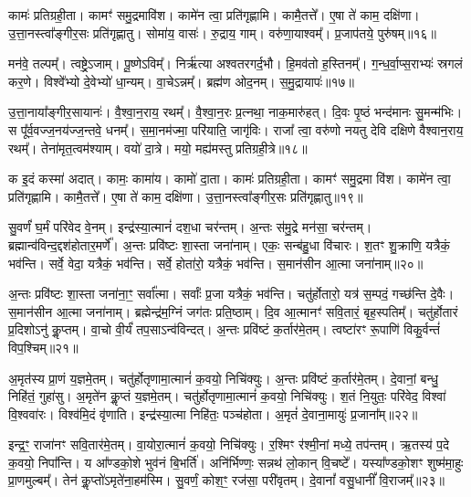 कामः॑ प्रतिग्रही॒ता। 
कामꣳ॑ समु॒द्रमावि॑श। 
कामे॑न त्वा॒ प्रति॑गृह्णामि। 
कामै॒तत्ते᳚। 
ए॒षा ते॑ काम॒ दक्षि॑णा। 
उ॒त्ता॒नस्त्वा᳚ङ्गीर॒सः प्रति॑गृह्णातु। 
सोमा॑य॒ वासः॑। 
रु॒द्राय॒ गाम्। 
वरु॑णा॒याश्वम्᳚। 
प्र॒जाप॑तये॒ पुरु॑षम्॥१६॥%

मन॑वे॒ तल्पम्᳚। 
त्वष्ट्रे॒ऽजाम्। 
पू॒ष्णेऽविम्᳚। 
निर्\mbox{}ऋ॑त्या अश्वतरगर्द॒भौ। 
हि॒मव॑तो ह॒स्तिनम्᳚। 
ग॒न्ध॒र्वा॒प्स॒राभ्यः॑ स्रगलं कर॒णे। 
विश्वे᳚भ्यो दे॒वेभ्यो॑ धा॒न्यम्। 
वा॒चेऽन्नम्᳚। 
ब्रह्म॑ण ओद॒नम्। 
स॒मु॒द्रायापः॑॥१७॥

उ॒त्ता॒नाया᳚ङ्गीर॒सायानः॑। 
वै॒श्वा॒न॒राय॒ रथम्᳚। 
वै॒श्वा॒न॒रः प्र॒त्नथा॒ नाक॒मारु॑हत्। 
दि॒वः पृ॒ष्ठं भन्द॑मानः सु॒मन्म॑भिः। 
स पू᳚र्व॒वज्ज॒नय॑ज्ज॒न्तवे॒ धनम्᳚। 
स॒मा॒नम॑ज्मा॒ परि॑याति॒ जागृ॑विः। 
राजा᳚ त्वा॒ वरु॑णो नयतु देवि दक्षिणे वैश्वान॒राय॒ रथम्᳚। 
तेना॑मृत॒त्वम॑श्याम्। 
वयो॑ दा॒त्रे। 
मयो॒ मह्य॑मस्तु प्रतिग्रही॒त्रे॥१८॥

क इ॒दं कस्मा॑ अदात्। 
कामः॒ कामा॑य। 
कामो॑ दा॒ता। 
कामः॑ प्रतिग्रही॒ता। 
कामꣳ॑ समु॒द्रमा वि॑श। 
कामे॑न त्वा॒ प्रति॑गृह्णामि। 
कामै॒तत्ते᳚। 
ए॒षा ते॑ काम॒ दक्षि॑णा। 
उ॒त्ता॒नस्त्वा᳚ङ्गीर॒सः प्रति॑गृह्णातु॥१९॥
\anuvakamend[दा॒ता पुरु॑ष॒मपः॑ प्रतिग्रही॒त्रे नव॑ च]

सु॒वर्णं॑ घ॒र्मं परि॑वेद वे॒नम्। 
इन्द्र॑स्या॒त्मानं॑ दश॒धा चर॑न्तम्। 
अ॒न्तः स॑मु॒द्रे मन॑सा॒ चर॑न्तम्। 
ब्रह्मान्व॑विन्द॒द्दश॑होतार॒मर्णे᳚। 
अ॒न्तः प्रवि॑ष्टः  शा॒स्ता जना॑नाम्। 
एकः॒ सन्ब॑हु॒धा वि॑चारः। 
श॒तꣳ शु॒क्राणि॒ यत्रैकं॒ भव॑न्ति। 
सर्वे॒ वेदा॒ यत्रैकं॒ भव॑न्ति। 
सर्वे॒ होता॑रो॒ यत्रैकं॒ भव॑न्ति। 
स॒मान॑सीन आ॒त्मा जना॑नाम्॥२०॥%

अ॒न्तः प्रवि॑ष्टः  शा॒स्ता जना॑ना॒ꣳ॒ सर्वा᳚त्मा। 
सर्वाः᳚ प्र॒जा यत्रैकं॒ भव॑न्ति। 
चतु॑र्\mbox{}होतारो॒ यत्र॑ स॒म्पदं॒ गच्छ॑न्ति दे॒वैः। 
स॒मान॑सीन आ॒त्मा जना॑नाम्। 
ब्रह्मेन्द्र॑म॒ग्निं जग॑तः प्रति॒ष्ठाम्। 
दि॒व आ॒त्मानꣳ॑ सवि॒तारं॒ बृह॒स्पतिम्᳚। 
चतु॑र्\mbox{}होतारं प्र॒दिशोऽनु॑ कॢ॒प्तम्। 
वा॒चो वी॒र्यं॑ तप॒साऽन्व॑विन्दत्। 
अ॒न्तः प्रवि॑ष्टं क॒र्तार॑मे॒तम्। 
त्वष्टा॑रꣳ रू॒पाणि॑ विकु॒र्वन्तं॑ विप॒श्चिम्॥२१॥

अ॒मृत॑स्य प्रा॒णं य॒ज्ञमे॒तम्। 
चतु॑र्\mbox{}होतृणामा॒त्मानं॑ क॒वयो॒ निचि॑क्युः। 
अ॒न्तः प्रवि॑ष्टं क॒र्तार॑मे॒तम्। 
दे॒वानां॒ बन्धु॒ निहि॑तं॒ गुहा॑सु। 
अ॒मृते॑न कॢ॒प्तं य॒ज्ञमे॒तम्। 
चतु॑र्\mbox{}होतृणामा॒त्मानं॑ क॒वयो॒ निचि॑क्युः। 
श॒तं नि॒युतः॒ परि॑वेद॒ विश्वा॑ वि॒श्ववा॑रः। 
विश्व॑मि॒दं वृ॑णाति। 
इन्द्र॑स्या॒त्मा निहि॑तः॒ पञ्च॑होता। 
अ॒मृतं॑ दे॒वाना॒मायुः॑ प्र॒जाना᳚म्॥२२॥%

इन्द्र॒ꣳ॒ राजा॑नꣳ सवि॒तार॑मे॒तम्। 
वा॒योरा॒त्मानं॑ क॒वयो॒ निचि॑क्युः। 
र॒श्मिꣳ र॑श्मी॒नां मध्ये॒ तप॑न्तम्। 
ऋ॒तस्य॑ प॒दे क॒वयो॒ निपा᳚न्ति। 
य आ᳚ण्डको॒शे भुव॑नं बि॒भर्ति॑। 
अनि॑र्भिण्णः॒ सन्नथ॑ लो॒कान् वि॒चष्टे᳚। 
यस्या᳚ण्डको॒शꣳ शुष्म॑मा॒हुः प्रा॒णमुल्बम्᳚। 
तेन॑ कॢ॒प्तो॑ऽमृते॑ना॒हम॑स्मि। 
सु॒वर्णं॒ कोश॒ꣳ॒ रज॑सा॒ परी॑वृतम्। 
दे॒वानां᳚ वसु॒धानीं᳚  वि॒राजम्᳚॥२३॥%

